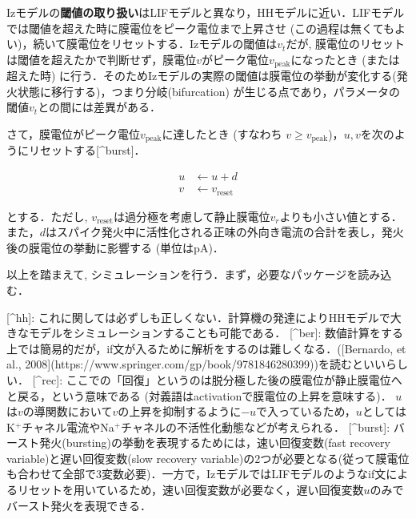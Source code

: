Izモデルの\textbf{閾値の取り扱い}はLIFモデルと異なり，HHモデルに近い．LIFモデルでは閾値を超えた時に膜電位をピーク電位まで上昇させ (この過程は無くてもよい)，続いて膜電位をリセットする．Izモデルの閾値は$v_t$だが, 膜電位のリセットは閾値を超えたかで判断せず，膜電位$v$がピーク電位$v_{\text{peak}}$になったとき (または超えた時) に行う．そのためIzモデルの実際の閾値は膜電位の挙動が変化する(発火状態に移行する)，つまり分岐(bifurcation) が生じる点であり，パラメータの閾値$v_t$との間には差異がある．

さて，膜電位がピーク電位$v_{\text{peak}}$に達したとき (すなわち  $v \geq v_{\text{peak}}$)，$u, v$を次のようにリセットする[^burst]．


\begin{align} 
u&\leftarrow u+d\\
v&\leftarrow v_{\text{reset}}
\end{align}


とする．ただし, $v_{\text{reset}}$は過分極を考慮して静止膜電位$v_r$よりも小さい値とする．また，$d$はスパイク発火中に活性化される正味の外向き電流の合計を表し，発火後の膜電位の挙動に影響する (単位はpA)．

以上を踏まえて, シミュレーションを行う．まず，必要なパッケージを読み込む．

[^hh]: これに関しては必ずしも正しくない．計算機の発達によりHHモデルで大きなモデルをシミュレーションすることも可能である．
[^ber]: 数値計算をする上では簡易的だが，if文が入るために解析をするのは難しくなる．([Bernardo, et al., 2008](https://www.springer.com/gp/book/9781846280399))を読むといいらしい．
[^rec]: ここでの「回復」というのは脱分極した後の膜電位が静止膜電位へと戻る，という意味である (対義語はactivationで膜電位の上昇を意味する)．
$u$は$v$の導関数において$v$の上昇を抑制するように$-u$で入っているため，$u$としてはK$^+$チャネル電流やNa$^+$チャネルの不活性化動態などが考えられる．
[^burst]: バースト発火(bursting)の挙動を表現するためには，速い回復変数(fast recovery variable)と遅い回復変数(slow recovery variable)の2つが必要となる(従って膜電位も合わせて全部で3変数必要)．一方で，IzモデルではLIFモデルのようなif文によるリセットを用いているため，速い回復変数が必要なく，遅い回復変数$u$のみでバースト発火を表現できる．
